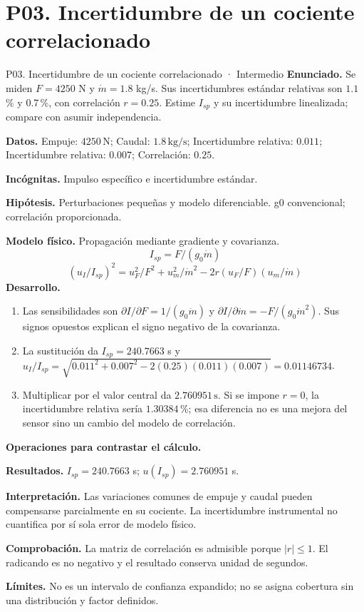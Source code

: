 \section{P03. Incertidumbre de un cociente correlacionado}
\begin{studiumworked}{P03. Incertidumbre de un cociente correlacionado · Intermedio}
\textbf{Enunciado.} Se miden $F=4250$ N y $\dot m=1.8$ kg/s. Sus incertidumbres estándar relativas son $1.1$\,\% y 0.7\,\%, con correlación $r=0.25$. Estime $I_{sp}$ y su incertidumbre linealizada; compare con asumir independencia.

\textbf{Datos.} Empuje: $4250\,\mathrm{N}$; Caudal: $1.8\,\mathrm{kg/s}$; Incertidumbre relativa: $0.011$; Incertidumbre relativa: $0.007$; Correlación: $0.25$.

\textbf{Incógnitas.} Impulso específico e incertidumbre estándar.

\textbf{Hipótesis.} Perturbaciones pequeñas y modelo diferenciable. g0 convencional; correlación proporcionada.

\textbf{Modelo físico.} Propagación mediante gradiente y covarianza.
\[I_{sp}=F/(g_0\dot m)\]
\[(u_I/I_{sp})^2=u_F^2/F^2+u_m^2/\dot m^2-2r(u_F/F)(u_m/\dot m)\]
\textbf{Desarrollo.}
\begin{enumerate}
\item Las sensibilidades son $\partial I/\partial F=1/(g_0\dot m)$ y $\partial I/\partial\dot m=-F/(g_0\dot m^2)$. Sus signos opuestos explican el signo negativo de la covarianza.
\item La sustitución da $I_{sp}=240.7663$ s y $u_I/I_{sp}=\sqrt{0.011^2+0.007^2-2(0.25)(0.011)(0.007)}=0.01146734$.
\item Multiplicar por el valor central da $2.760951\,\mathrm{s}$. Si se impone $r=0$, la incertidumbre relativa sería $1.30384$\,\%; esa diferencia no es una mejora del sensor sino un cambio del modelo de correlación.
\end{enumerate}
\textbf{Operaciones para contrastar el cálculo.}

\textbf{Resultados.} $I_{sp}=240.7663$ s; $u(I_{sp})=2.760951$ s.

\textbf{Interpretación.} Las variaciones comunes de empuje y caudal pueden compensarse parcialmente en su cociente. La incertidumbre instrumental no cuantifica por sí sola error de modelo físico.

\textbf{Comprobación.} La matriz de correlación es admisible porque $|r|\leq1$. El radicando es no negativo y el resultado conserva unidad de segundos.

\textbf{Límites.} No es un intervalo de confianza expandido; no se asigna cobertura sin una distribución y factor definidos.
\end{studiumworked}
